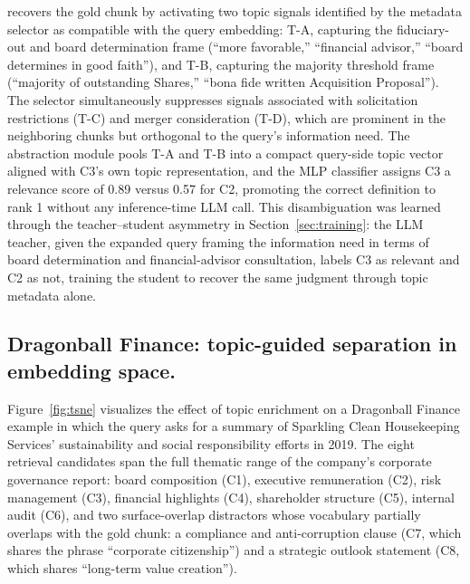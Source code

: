 \name{} recovers the gold chunk by activating two topic signals identified by the metadata selector as compatible with the query embedding: T-A, capturing the fiduciary-out and board determination frame (``more favorable,'' ``financial advisor,'' ``board determines in good faith''), and T-B, capturing the majority threshold frame (``majority of outstanding Shares,'' ``bona fide written Acquisition Proposal''). The selector simultaneously suppresses signals associated with solicitation restrictions (T-C) and merger consideration (T-D), which are prominent in the neighboring chunks but orthogonal to the query's information need. The abstraction module pools T-A and T-B into a compact query-side topic vector aligned with C3's own topic representation, and the MLP classifier assigns C3 a relevance score of 0.89 versus 0.57 for C2, promoting the correct definition to rank 1 without any inference-time LLM call. This disambiguation was learned through the teacher--student asymmetry in Section~\ref{sec:training}: the LLM teacher, given the expanded query framing the information need in terms of board determination and financial-advisor consultation, labels C3 as relevant and C2 as not, training the student to recover the same judgment through topic metadata alone.

\subsection{Dragonball Finance: topic-guided separation in embedding space.}
Figure~\ref{fig:tsne} visualizes the effect of topic enrichment on a Dragonball Finance example in which the query asks for a summary of Sparkling Clean Housekeeping Services' sustainability and social responsibility efforts in 2019. The eight retrieval candidates span the full thematic range of the company's corporate governance report: board composition (C1), executive remuneration (C2), risk management (C3), financial highlights (C4), shareholder structure (C5), internal audit (C6), and two surface-overlap distractors whose vocabulary partially overlaps with the gold chunk: a compliance and anti-corruption clause (C7, which shares the phrase ``corporate citizenship'') and a strategic outlook statement (C8, which shares ``long-term value creation'').

